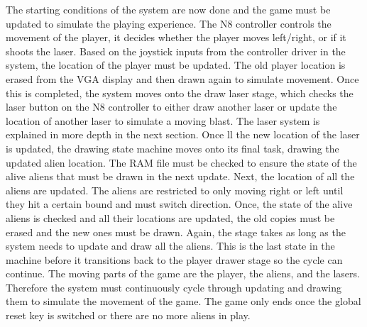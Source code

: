 \documentclass[11pt, titlepage]{article}
\begin{document}
            The starting conditions of the system are now done and the game must be updated to simulate the playing experience. The N8 controller controls the movement of the player, it decides whether the player moves left/right, or if it shoots the laser. Based on the joystick inputs from the controller driver in the system, the location of the player must be updated. The old player location is erased from the VGA display and then drawn again to simulate movement. Once this is completed, the system moves onto the draw laser stage, which checks the laser button on the N8 controller to either draw another laser or update the location of another laser to simulate a moving blast. The laser system is explained in more depth in the next section. Once ll the new location of the laser is updated, the drawing state machine moves onto its final task, drawing the updated alien location. The RAM file must be checked to ensure the state of the alive aliens that must be drawn in the next update. Next, the location of all the aliens are updated. The aliens are restricted to only moving right or left until they hit a certain bound and must switch direction. Once, the state of the alive aliens is checked and all their locations are updated, the old copies must be erased and the new ones must be drawn. Again, the stage takes as long as the system needs to update and draw all the aliens. This is the last state in the machine before it transitions back to the player drawer stage so the cycle can continue. The moving parts of the game are the player, the aliens, and the lasers. Therefore the system must continuously cycle through updating and drawing them to simulate the movement of the game. The game only ends once the global reset key is switched or there are no more aliens in play.
        
\end{document}
